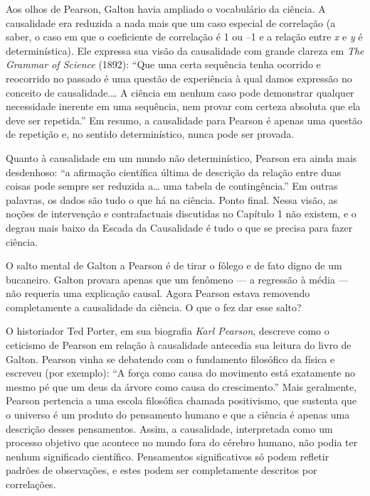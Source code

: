 \documentclass[11pt,a5paper,twoside]{book}
\begin{document}
Aos olhos de Pearson, Galton havia ampliado o vocabulário da ciência. A causalidade era reduzida a nada mais que um caso especial de correlação (a saber, o caso em que o coeficiente de correlação é 1 ou –1 e a relação entre \textit{x} e \textit{y} é determinística). Ele expressa sua visão da causalidade com grande clareza em \textit{The Grammar of Science} (1892): “Que uma certa sequência tenha ocorrido e reocorrido no passado é uma questão de experiência à qual damos expressão no conceito de causalidade.… A ciência em nenhum caso pode demonstrar qualquer necessidade inerente em uma sequência, nem provar com certeza absoluta que ela deve ser repetida.” Em resumo, a causalidade para Pearson é apenas uma questão de repetição e, no sentido determinístico, nunca pode ser provada.

Quanto à causalidade em um mundo não determinístico, Pearson era ainda mais desdenhoso: “a afirmação científica última de descrição da relação entre duas coisas pode sempre ser reduzida a… uma tabela de contingência.” Em outras palavras, os dados são tudo o que há na ciência. Ponto final. Nessa visão, as noções de intervenção e contrafactuais discutidas no Capítulo 1 não existem, e o degrau mais baixo da Escada da Causalidade é tudo o que se precisa para fazer ciência.

O salto mental de Galton a Pearson é de tirar o fôlego e de fato digno de um bucaneiro. Galton provara apenas que um fenômeno — a regressão à média — não requeria uma explicação causal. Agora Pearson estava removendo completamente a causalidade da ciência. O que o fez dar esse salto?

O historiador Ted Porter, em sua biografia \textit{Karl Pearson}, descreve como o ceticismo de Pearson em relação à causalidade antecedia sua leitura do livro de Galton. Pearson vinha se debatendo com o fundamento filosófico da física e escreveu (por exemplo): “A força como causa do movimento está exatamente no mesmo pé que um deus da árvore como causa do crescimento.” Mais geralmente, Pearson pertencia a uma escola filosófica chamada positivismo, que sustenta que o universo é um produto do pensamento humano e que a ciência é apenas uma descrição desses pensamentos. Assim, a causalidade, interpretada como um processo objetivo que acontece no mundo fora do cérebro humano, não podia ter nenhum significado científico. Pensamentos significativos só podem refletir padrões de observações, e estes podem ser completamente descritos por correlações.
\end{document}
